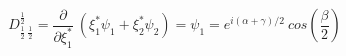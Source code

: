 \begin{equation}
D_{\frac{1}{2}~\frac{1}{2}}^{\frac{1}{2}}= \frac{\partial}{\partial \xi_1^*}~(\xi_1^* \psi_1 +\xi_2^* \psi_2)= \psi_1= e^{i(\alpha+\gamma)/2}~cos(\frac{\beta}{2})
\end{equation}

